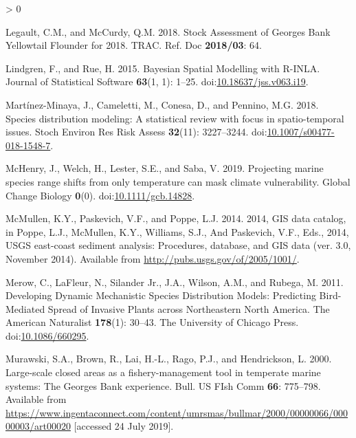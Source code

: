 \documentclass[
]{article}
\newlength{\cslhangindent}
\newenvironment{CSLReferences}[2] %
 {%
  \setlength{\parindent}{0pt}
  \ifodd #1 \everypar{\setlength{\hangindent}{\cslhangindent}}\ignorespaces\fi
  \ifnum #2 > 0
  \setlength{\parskip}{#2\baselineskip}
  \fi
 }%
 {}
\begin{document}
\begin{CSLReferences}{1}{0}
\leavevmode\hypertarget{ref-legaultStockAssessmentGeorges2018}{}%
Legault, C.M., and McCurdy, Q.M. 2018. Stock {Assessment} of {Georges Bank Yellowtail Flounder} for 2018. TRAC. Ref. Doc \textbf{2018/03}: 64.

\leavevmode\hypertarget{ref-lindgrenBayesianSpatialModelling2015}{}%
Lindgren, F., and Rue, H. 2015. Bayesian {Spatial Modelling} with {R}-{INLA}. Journal of Statistical Software \textbf{63}(1, 1): 1--25. doi:\href{https://doi.org/10.18637/jss.v063.i19}{10.18637/jss.v063.i19}.

\leavevmode\hypertarget{ref-martinez-minayaSpeciesDistributionModeling2018}{}%
Martínez-Minaya, J., Cameletti, M., Conesa, D., and Pennino, M.G. 2018. Species distribution modeling: A statistical review with focus in spatio-temporal issues. Stoch Environ Res Risk Assess \textbf{32}(11): 3227--3244. doi:\href{https://doi.org/10.1007/s00477-018-1548-7}{10.1007/s00477-018-1548-7}.

\leavevmode\hypertarget{ref-mchenryProjectingMarineSpecies2019}{}%
McHenry, J., Welch, H., Lester, S.E., and Saba, V. 2019. Projecting marine species range shifts from only temperature can mask climate vulnerability. Global Change Biology \textbf{0}(0). doi:\href{https://doi.org/10.1111/gcb.14828}{10.1111/gcb.14828}.

\leavevmode\hypertarget{ref-mcmullen2014GISData2014}{}%
McMullen, K.Y., Paskevich, V.F., and Poppe, L.J. 2014. 2014, {GIS} data catalog, in {Poppe}, {L}.{J}., {McMullen}, {K}.{Y}., {Williams}, {S}.{J}., And {Paskevich}, {V}.{F}., Eds., 2014, {USGS} east-coast sediment analysis: {Procedures}, database, and {GIS} data (ver. 3.0, {November} 2014). Available from \url{http://pubs.usgs.gov/of/2005/1001/}.

\leavevmode\hypertarget{ref-merowDevelopingDynamicMechanistic2011}{}%
Merow, C., LaFleur, N., Silander Jr., J.A., Wilson, A.M., and Rubega, M. 2011. Developing {Dynamic Mechanistic Species Distribution Models}: {Predicting Bird}-{Mediated Spread} of {Invasive Plants} across {Northeastern North America}. The American Naturalist \textbf{178}(1): 30--43. {The University of Chicago Press}. doi:\href{https://doi.org/10.1086/660295}{10.1086/660295}.

\leavevmode\hypertarget{ref-murawskiLargescaleClosedAreas2000}{}%
Murawski, S.A., Brown, R., Lai, H.-L., Rago, P.J., and Hendrickson, L. 2000. Large-scale closed areas as a fishery-management tool in temperate marine systems: The {Georges Bank} experience. Bull. US FIsh Comm \textbf{66}: 775--798. Available from \url{https://www.ingentaconnect.com/content/umrsmas/bullmar/2000/00000066/00000003/art00020} {[}accessed 24 July 2019{]}.


\end{CSLReferences}
\end{document}
